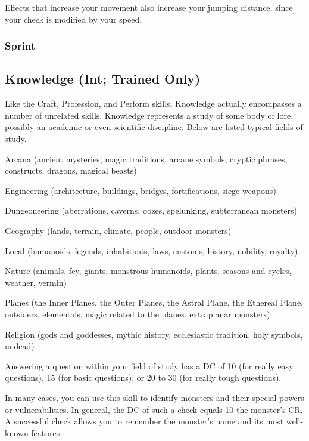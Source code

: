  Effects that increase your movement also increase your jumping distance, since your check is modified by your speed.

\subsubsection{Sprint}



\subsection{Knowledge (Int; Trained Only)}
Like the Craft, Profession, and Perform skills, Knowledge actually encompasses a number of unrelated skills. Knowledge represents a study of some body of lore, possibly an academic or even scientific discipline. Below are listed typical fields of study.
\begin{itemize*}
\item Arcana (ancient mysteries, magic traditions, arcane symbols,
cryptic phrases, constructs, dragons, magical beasts)
\item Engineering (architecture, buildings, bridges, fortifications, siege weapons)
\item Dungeoneering (aberrations, caverns, oozes, spelunking, subterranean monsters)
\item Geography (lands, terrain, climate, people, outdoor monsters)
\item Local (humanoids, legends, inhabitants, laws, customs, history, nobility, royalty)
\item Nature (animals, fey, giants, monstrous humanoids, plants, seasons and cycles, weather, vermin)
\item Planes (the Inner Planes, the Outer Planes, the Astral Plane,
the Ethereal Plane, outsiders, elementals, magic related to the planes, extraplanar monsters)
\item Religion (gods and goddesses, mythic history, ecclesiastic tradition, holy symbols, undead)
\end{itemize*}
 Answering a question within your field of study has a DC of 10 (for really easy questions), 15 (for basic questions), or 20 to 30 (for really tough questions).

In many cases, you can use this skill to identify monsters and their special powers or vulnerabilities. In general, the DC of such a check equals 10 \add the monster's CR. A successful check allows you to remember the monster's name and its most well-known features.

